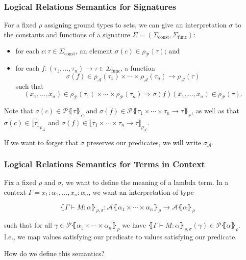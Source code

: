 \documentclass[aspectratio=169]{beamer}
\begin{document}
\begin{frame}
\frametitle{Logical Relations Semantics for Signatures}

\pause

For a fixed $\rho$ assigning ground types to sets, we can give an interpretation $\sigma$  to the constants and functions of a signature $\Sigma = (\Sigma_{\text{const}}, \Sigma_{\text{func}})$:
\begin{itemize}
    \pause
    \item for each $c : \tau \in \Sigma_{\text{const}}$, an element $\sigma(c) \in \rho_{\mathcal{P}}(\tau)$; and
    \pause
    \item for each $f : (\tau_1, \ldots, \tau_n) \to \tau \in \Sigma_{\text{func}}$, a function
    \[\sigma(f) \in \rho_{\mathcal{A}}(\tau_1) \times \cdots \times \rho_{\mathcal{A}}(\tau_n) \to \rho_{\mathcal{A}}(\tau)\]
    such that
    \[(x_1, \ldots, x_n) \in \rho_{\mathcal{P}}(\tau_1) \times \cdots \times \rho_{\mathcal{P}}(\tau_n) \Rightarrow \sigma(f)(x_1, \ldots, x_n) \in \rho_{\mathcal{P}}(\tau).\]
\end{itemize}

\medskip
\pause

Note that $\sigma(c) \in \mathcal{P}\lBrace \tau \rBrace_{\rho}$ and $\sigma(f) \in \mathcal{P}\lBrace \tau_1 \times \cdots \times \tau_n \rightarrow \tau \rBrace_{\rho}$, as well as that $\sigma(c) \in \llbracket \tau \rrbracket_{\rho_{\mathcal{A}}}$ and $\sigma(f) \in \llbracket \tau_1 \times \cdots \times \tau_n \rightarrow \tau \rrbracket_{\rho_{\mathcal{A}}}$.

\medskip
\pause

If we want to forget that $\sigma$ preserves our predicates, we will write $\sigma_{\mathcal{A}}$.

\end{frame}

\begin{frame}
\frametitle{Logical Relations Semantics for Terms in Context}

\pause

Fix a fixed $\rho$ and $\sigma$, we want to define the meaning of a lambda term.
In a context $\Gamma = x_1 : \alpha_1, \ldots, x_n : \alpha_n$, we want an interpretation of type

\[
\lBrace \Gamma \vdash M : \alpha \rBrace_{\rho, \sigma} : \mathcal{A}\lBrace \alpha_1 \times \cdots \times \alpha_n \rBrace_\rho \to \mathcal{A}\lBrace \alpha \rBrace_\rho
\]

such that for all $\gamma \in \mathcal{P}\lBrace \alpha_1 \times \cdots \times \alpha_n \rBrace_\rho$ we have $\lBrace \Gamma \vdash M : \alpha \rBrace_{\rho, \sigma}(\gamma) \in \mathcal{P}\lBrace \alpha \rBrace_\rho$.
I.e., we map values satisfying our predicate to values satisfying our predicate.

\medskip

How do we define this semantics?

\end{frame}
\end{document}

